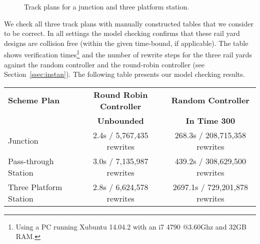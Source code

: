 \begin{figure}[H]
\caption{Track plans for a junction and three platform station.}
\label{fig:junction}
\label{fig:threestation}
\end{figure}

We check all three track plans with manually constructed tables that
we consider to be correct. In all settings the model checking confirms
that these rail yard designs are collision free (within the given
time-bound, if applicable).  The table shows verification
times\footnote{Using a PC running Xubuntu
  14.04.2 with an i7 4790 @3.60Ghz and 32GB RAM.} and the number of
rewrite steps for the three rail yards against the random controller
and the round-robin controller (see Section~\ref{ssec:instan}).  The
following table presents our model checking results.
%
%
{\small
  \begin{center}
  \begin{tabular}{|l|c|c|}
    \hline 
    \textbf{Scheme Plan} & \textbf{Round Robin Controller} &
    \textbf{Random Controller} \\
    & \textbf{Unbounded} & \textbf{In Time 300} \\
    \hline \hline
    Junction  & 2.4s / 5,767,435 rewrites & 268.3s / 208,715,358 rewrites \\
    Pass-through Station & 3.0s  / 7,135,987 rewrites & 439.2s / 308,629,500 rewrites \\
    Three Platform Station & 2.8s / 6,624,578 rewrites & 2697.1s / 729,201,878 rewrites \\
    \hline
 \end{tabular}
  \end{center}
}
%


